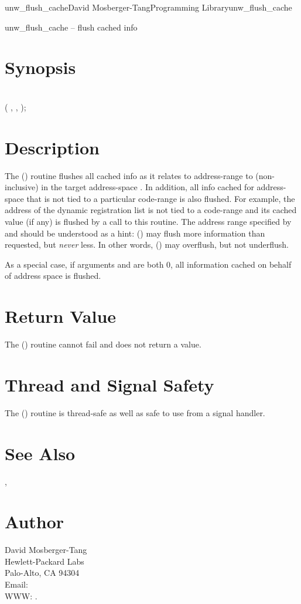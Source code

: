 \documentclass{article}
\begin{document}
\begin{Name}{3}{unw\_flush\_cache}{David Mosberger-Tang}{Programming Library}{unw\_flush\_cache}

  unw\_flush\_cache -- flush cached info
\end{Name}

\section{Synopsis}

\\

 ( ,  ,  );\\

\section{Description}

The () routine flushes all cached info as it
relates to address-range  to  (non-inclusive) in the
target address-space .  In addition, all info cached for
address-space  that is not tied to a particular code-range is
also flushed.  For example, the address of the dynamic registration
list is not tied to a code-range and its cached value (if any) is
flushed by a call to this routine.  The address range specified by
 and  should be understood as a hint:
() may flush more information than requested,
but \emph{never} less.  In other words, () may
overflush, but not underflush.

As a special case, if arguments  and  are both 0, all
information cached on behalf of address space  is flushed.

\section{Return Value}

The () routine cannot fail and does not
return a value.

\section{Thread and Signal Safety}

The () routine is thread-safe as well as safe to
use from a signal handler.

\section{See Also}

,

\section{Author}

\noindent
David Mosberger-Tang\\
Hewlett-Packard Labs\\
Palo-Alto, CA 94304\\
Email: \\
WWW: .
\LatexManEnd
\end{document}
